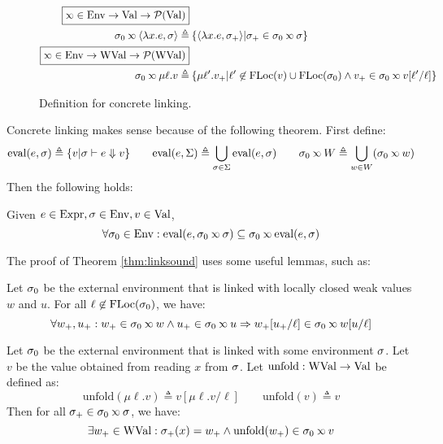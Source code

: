 \documentclass{article}
\begin{document}
\begin{figure}
\begin{align*}
		\fbox{$\semlink\in\Ctx\rightarrow\Value\rightarrow\pset(\Value)$}                                                                                                                                  \\
		\ctx_0\semlink\langle\lambda x.e,\ctx\rangle\triangleq & \: \{\langle\lambda x.e,\ctx_+\rangle|\ctx_+\in\ctx_0\semlink\ctx\}                                                                       \\
		\fbox{$\semlink\in\Ctx\rightarrow\Walue\rightarrow\pset(\Walue)$}                                                                                                                                  \\
		\ctx_0\semlink\mu\ell.v\triangleq                      & \: \{\mu\ell'.v_+|\ell'\not\in\FLoc(v)\cup\FLoc(\ctx_0)\land v_+\in\ctx_0\semlink v[\ell'/\ell]\}
	\end{align*}
	\caption{Definition for concrete linking.}
	\label{fig:conclink}
\end{figure}

Concrete linking makes sense because of the following theorem.
First define:
\[\eval(e,\ctx)\triangleq\{v|\ctx\vdash e\Downarrow v\}\qquad\eval(e,\Sigma)\triangleq\bigcup_{\ctx\in\Sigma}\eval(e,\ctx)\qquad\ctx_0\semlink W\triangleq\bigcup_{w\in W}(\ctx_0\semlink w)\]
Then the following holds:
\begin{thm}\label{thm:linksound}
	Given $e\in\text{Expr},\sigma\in\text{Env},v\in\text{Val}$,
	\[\forall\ctx_0\in\Ctx:\eval(e,\ctx_0\semlink\ctx)\subseteq\ctx_0\semlink\eval(e,\ctx)\]
\end{thm}

The proof of Theorem \ref{thm:linksound} uses some useful lemmas, such as:
\begin{lem}
	Let $\sigma_0$ be the external environment that is linked with locally closed weak values $w$ and $u$.
	For all $\ell\not\in\text{FLoc}(\sigma_0)$, we have:
	\[\forall w_+,u_+:w_+\in\ctx_0\semlink w\wedge u_+\in\ctx_0\semlink u\Rightarrow w_+[u_+/\ell]\in\ctx_0\semlink w[u/\ell]\]
\end{lem}
\begin{lem}
	Let $\sigma_0$ be the external environment that is linked with some environment $\sigma$.
	Let $v$ be the value obtained from reading $x$ from $\sigma$.
	Let $\text{unfold}:\text{WVal}\rightarrow\text{Val}$ be defined as:
	\[\text{unfold}(\mu\ell.v)\triangleq v[\mu\ell.v/\ell]\qquad\text{unfold}(v)\triangleq v\]
	Then for all $\ctx_+\in\ctx_0\semlink\ctx$, we have:
	\[\exists w_+\in\Walue:\ctx_+(x)=w_+\land\text{unfold}(w_+)\in\ctx_0\semlink v\]
\end{lem}
\clearpage
\end{document}
